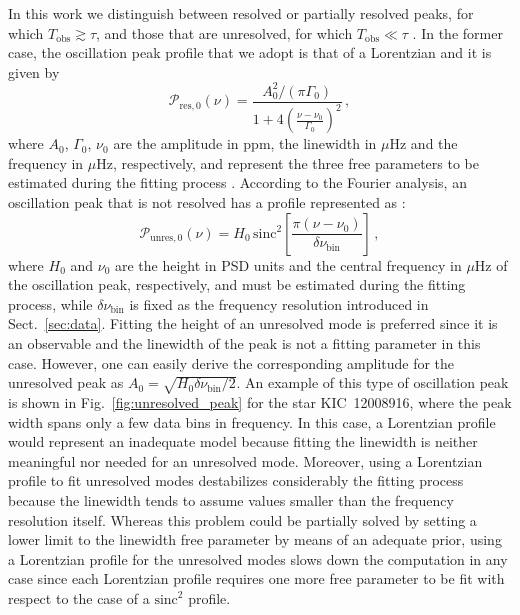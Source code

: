 \documentclass[structabstract]{aa}
\newcommand{\muhz}{$\mu$Hz}
\newcommand{\kic}{KIC~12008916}
\begin{document}
In this work we distinguish between resolved or partially resolved peaks, for which $T_\mathrm{obs} \gtrsim \tau$, and those that are unresolved, for which $T_\mathrm{obs} \ll \tau$ \citep[e.g. see also][who used a similar approach]{Baudin11temp}. In the former case, the oscillation peak profile that we adopt is that of a Lorentzian \citep[e.g. see][]{Kumar88,Anderson90} and it is given by
\begin{equation}
\mathcal{P}_{\mathrm{res},0} \left( \nu \right) = \frac{A_0^2 / \left( \pi \Gamma_0 \right)}{1 + 4 \left( \frac{\nu - \nu_{0}}{\Gamma_0} \right)^2} \, ,
\label{eq:resolved_profile}
\end{equation}
where $A_0$, $\Gamma_0$, $\nu_0$ are the amplitude in ppm, the linewidth in \muhz\,\,and the frequency in \muhz, respectively, and represent the three free parameters to be estimated during the fitting process \citep[see][for more details about the relation between amplitude and linewidth of the peak]{Baudin05}.
According to the Fourier analysis, an oscillation peak that is not resolved has a profile represented as \citep{CD04}:
\begin{equation}
\mathcal{P}_{\mathrm{unres},0} \left(\nu \right) = H_0 \, \mbox{sinc}^2 \left[ \frac{\pi \left(\nu - \nu_0 \right)}{\delta \nu_\mathrm{bin}} \right] \, ,
\label{eq:unresolved_profile}
\end{equation}
where $H_0$ and $\nu_0$ are the height in PSD units and the central frequency in \muhz\,\,of the oscillation peak, respectively, and must be estimated during the fitting process, while $\delta \nu_\mathrm{bin}$ is fixed as the frequency resolution introduced in Sect.~\ref{sec:data}. Fitting the height of an unresolved mode is preferred since it is an observable and the linewidth of the peak is not a fitting parameter in this case. However, one can easily derive the corresponding amplitude for the unresolved peak as $A_0 = \sqrt{H_0\delta\nu_\mathrm{bin}/2}$. An example of this type of oscillation peak is shown in Fig.~\ref{fig:unresolved_peak} for the star \kic, where the peak width spans only a few data bins in frequency. In this case, a Lorentzian profile would represent an inadequate model because fitting the linewidth is neither meaningful nor needed for an unresolved mode. Moreover, using a Lorentzian profile to fit unresolved modes destabilizes considerably the fitting process because the linewidth tends to assume values smaller than the frequency resolution itself. Whereas this problem could be partially solved by setting a lower limit to the linewidth free parameter by means of an adequate prior, using a Lorentzian profile for the unresolved modes slows down the computation in any case since each Lorentzian profile requires one more free parameter to be fit with respect to the case of a $\mbox{sinc}^2$ profile. 
\end{document}
